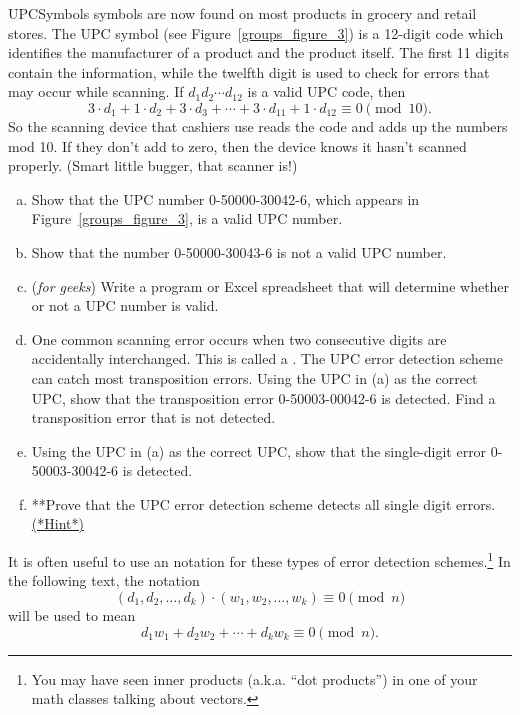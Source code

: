 \begin{exercise}{UPCSymbols} 
 symbols are now found on most
products in grocery and retail stores. The UPC symbol (see Figure~\ref{groups_figure_3}) is a 12-digit
code which identifies the manufacturer of a product and the product itself. The first 11 digits contain the information, while the twelfth digit is used to check for errors that may occur while scanning. If $d_1 d_2
\cdots d_{12}$ is a valid UPC code, then  
\[
3 \cdot d_1 + 1 \cdot d_2 + 3 \cdot d_3 + \cdots + 3 \cdot
d_{11} + 1 \cdot d_{12} \equiv 0 \pmod{10}.
\]
So the scanning device that cashiers use reads the code and adds up the numbers mod 10. If they don't add to zero, then the device knows it hasn't scanned properly. 
(Smart little bugger, that scanner is!)

\begin{enumerate}[(a)]
\item
Show that the UPC number  0-50000-30042-6, which appears in
Figure~\ref{groups_figure_3}, is a valid UPC number. 
 
\item
Show that the number 0-50000-30043-6 is not a valid UPC number.
 
\item (\emph{for geeks}) Write a program or Excel spreadsheet that will determine whether or not a UPC number is valid. 

\item
One common scanning error occurs when two consecutive digits are accidentally interchanged. This is called a . 
The  UPC error detection scheme can catch most transposition errors.  Using the UPC in (a) as the correct UPC, show that the transposition error 0-50003-00042-6 is detected.  Find a transposition error that is not detected. 

\item
 Using the UPC in (a) as the correct UPC, show that the single-digit error 0-50003-30042-6 is detected.  
\item
**Prove that the UPC error detection scheme detects all single digit errors. 
\hyperref[sec:modular_arithmetic:hints]{(*Hint*)}   
\end{enumerate}
\end{exercise} 
 

It is often useful to use an  notation for these types of error detection schemes.\footnote{You may have seen inner products (a.k.a. ``dot products'') in one of your math classes talking about vectors.} In the following text, the notation
\[
(d_1, d_2, \ldots, d_k ) \cdot (w_1, w_2, \ldots, w_k ) \equiv 0 \pmod{ n }
\]
will be used to mean
\[
d_1 w_1 +  d_2 w_2 + \cdots +  d_k w_k  \equiv 0  \pmod{ n}.
\]

